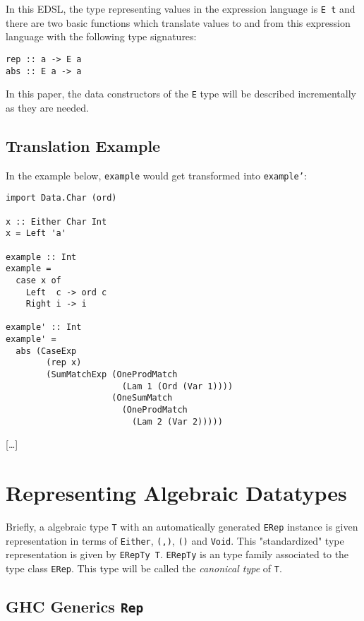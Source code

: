 \documentclass[sigplan,screen]{acmart}
\newcommand{\ttt}{\texttt}
\begin{document}
In this EDSL, the type representing values in the expression language is \ttt{E t}
and there are two basic functions which translate values to and from this
expression language with the following type signatures:

\begin{lstlisting}
rep :: a -> E a
abs :: E a -> a
\end{lstlisting}

In this paper, the data constructors of the \ttt{E} type will be described
incrementally as they are needed.


\subsection{Translation Example} %


In the example below, \ttt{example} would get transformed into \ttt{example'}:

\begin{lstlisting}[deletekeywords={Ord}]
import Data.Char (ord)

x :: Either Char Int
x = Left 'a'

example :: Int
example =
  case x of
    Left  c -> ord c
    Right i -> i

example' :: Int
example' =
  abs (CaseExp
        (rep x)
        (SumMatchExp (OneProdMatch
                       (Lam 1 (Ord (Var 1))))
                     (OneSumMatch
                       (OneProdMatch
                         (Lam 2 (Var 2)))))
\end{lstlisting}

[\ldots]

\section{Representing Algebraic Datatypes}

Briefly, a algebraic type \ttt{T} with an automatically generated \ttt{ERep}
instance is given representation in terms of \ttt{Either}, \ttt{(,)},
\ttt{()} and \ttt{Void}. This "standardized" type representation is
given by \ttt{ERepTy T}. \ttt{ERepTy} is an type family associated to
the type class \ttt{ERep}. This type will be called the \textit{canonical type}
of \ttt{T}.

\subsection{GHC Generics \ttt{Rep}}
\end{document}
